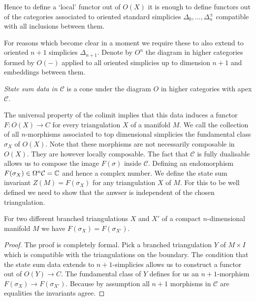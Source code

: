 Hence to define a `local' functor out of $O(X)$ it is enough to define functors out of the categories associated to oriented standard simplicies $\Delta_0,\dots , \Delta_n^\pm$ compatible with all inclusions between them.

For reasons which become clear in a moment we require these to also extend to oriented $n+1$ simplicies $\Delta_{n+1}$.
Denote by $O^n$ the diagram in higher categories formed by $O(-)$ applied to all oriented simplicies up to dimension $n+1$ and embeddings between them.

\begin{definition}
	\emph{State sum data in $\mathcal{C}$} is a cone under the diagram $O$ in higher categories with apex $\mathcal{C}$.
\end{definition}

The universal property of the colimit implies that this data induces a functor $F\colon O(X)\longrightarrow C $ for every triangulation $X$ of a manifold $M$.
We call the collection of all $n$-morphisms associated to top dimensional simplicies the fundamental class $\sigma_X$ of $O(X)$.
Note that these morphisms are not necessarily composable in $O(X)$.
They are however locally composable.
The fact that $\mathcal{C}$ is fully dualisable
allows us to compose the image $F(\sigma)$ inside $\mathcal{C}$.
Defining an endomorphism
$F(\sigma_X)\in \Omega^n\mathcal{C}=\mathbb{C} $ and hence a complex number.
We define the state sum invariant $Z(M)=F(\sigma_X)$ for any triangulation $X$ of $M$.
For this to be well defined we need to show that the anwser is independent of the chosen triangulation.

\begin{theorem}
For two different branched triangulations $X$ and $X'$ of a compact $n$-dimensional manifold $M$ we have $F(\sigma_X)=F(\sigma_{X'})$.
\end{theorem}
\begin{proof}
The proof is completely formal.
Pick a branched triangulation $Y$ of $M\times I$ which is compatible with the triangulations on the boundary.
The condition that the state sum data extends to $n+1$-simplicies allows us to construct a functor out of $O(Y)\longrightarrow C $.
The fundamental class of $Y$ defines for us an $n+1$-morphism $F(\sigma_X)\longrightarrow F(\sigma_{X'})$.
Because by assumption all $n+1$ morphisms in $\mathcal{C}$ are equalities the invariants agree.

\end{proof}
\begin{remark}
\end{remark}
